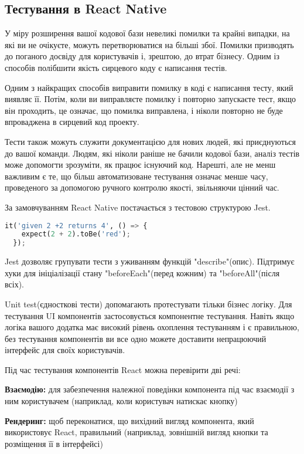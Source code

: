 \subsection{Тестування в React Native}
\label{subsec:rn_testing}
У міру розширення вашої кодової бази невеликі помилки та крайні випадки, на які ви не очікуєте, можуть перетворюватися на більші збої.
Помилки призводять до поганого досвіду для користувачів і, зрештою, до втрат бізнесу.
Одним із способів полібшити якість сирцевого коду є написання тестів.

Одним з найкращих способів виправити помилку в коді є написання тесту, який виявляє її.
Потім, коли ви виправляєте помилку і повторно запускаєте тест, якщо він проходить, це означає, що помилка виправлена,
і ніколи повторно не буде впроваджена в сирцевий код проекту.

Тести також можуть служити документацією для нових людей, які приєднуються до вашої команди.
Людям, які ніколи раніше не бачили кодової бази, аналіз тестів може допомогти зрозуміти, як працює існуючий код.
Нарешті, але не менш важливим є те, що більш автоматизоване тестування означає менше часу, проведеного за допомогою
ручного контролю якості, звільняючи цінний час.

За замовчуванням React Native постачається з тестовою структурою Jest. \cite{jest_home_page}

\begin{lstlisting}[style=light, language=Python,label={lst:rn_jest_test},caption=Jest Unit Test]
  it('given 2 +2 returns 4', () => {
    expect(2 + 2).toBe('red');
  });
\end{lstlisting}

Jest дозволяє групувати тести з уживанням функцій "describe"(опис).
Підтримує хуки для ініціалізації стану "beforeEach"(перед кожним) та "beforeAll"(після всіх).

Unit test(єдносткові тести) допомагають протестувати тільки бізнес логіку.
Для тестування UI компонентів застосовується компонентне тестування.
Навіть якщо логіка вашого додатка має високий рівень охоплення тестуванням і є правильною,
без тестування компонентів ви все одно можете доставити непрацюючий інтерфейс для своїх користувачів.

Під час тестування компонентів React можна перевірити дві речі:

\begin{itemize}
    \begin{item}
        \textbf{Взаємодію:} для забезпечення належної поведінки компонента під час взаємодії з ним користувачем (наприклад, коли користувач натискає кнопку)
    \end{item}
    \begin{item}
        \textbf{Рендеринг:} щоб переконатися, що вихідний вигляд компонента, який використовує React, правильний (наприклад, зовнішній вигляд кнопки та розміщення її в інтерфейсі)
    \end{item}
\end{itemize}

